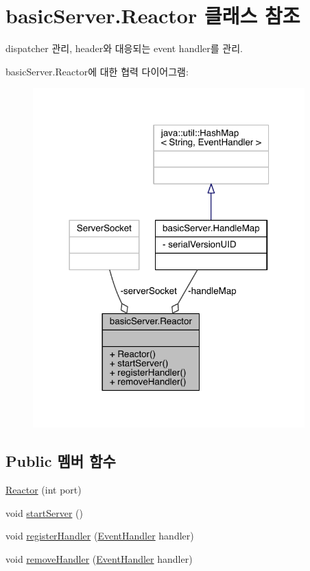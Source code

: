 \hypertarget{classbasic_server_1_1_reactor}{\section{basic\+Server.\+Reactor 클래스 참조}
\label{classbasic_server_1_1_reactor}
}


dispatcher 관리, header와 대응되는 event handler를 관리.  




basic\+Server.\+Reactor에 대한 협력 다이어그램\+:
\nopagebreak
\begin{figure}[H]
\begin{center}
\leavevmode
\includegraphics[width=297pt]{classbasic_server_1_1_reactor__coll__graph}
\end{center}
\end{figure}
\subsection*{Public 멤버 함수}
\begin{DoxyCompactItemize}
\item 
\hyperlink{classbasic_server_1_1_reactor_ad31c6a01771438f1f124eba778e49c0a}{Reactor} (int port)
\item 
void \hyperlink{classbasic_server_1_1_reactor_aaa28ae533a17acacc0acb5a7161c84e5}{start\+Server} ()
\item 
void \hyperlink{classbasic_server_1_1_reactor_ab74b6a96ff989298eb36a1cf3fd0e69f}{register\+Handler} (\hyperlink{interfaceevent_handler_1_1_event_handler}{Event\+Handler} handler)
\item 
void \hyperlink{classbasic_server_1_1_reactor_ab50f8b7b6adf4b18ccca715fa2ca8182}{remove\+Handler} (\hyperlink{interfaceevent_handler_1_1_event_handler}{Event\+Handler} handler)
\end{DoxyCompactItemize}
